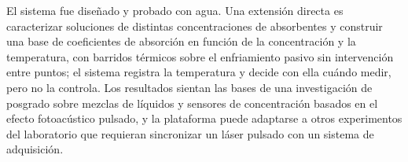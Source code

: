 El sistema fue diseñado y probado con agua. Una extensión directa es
caracterizar soluciones de distintas concentraciones de absorbentes y
construir una base de coeficientes de absorción en función de la
concentración y la temperatura, con barridos térmicos sobre el
enfriamiento pasivo sin intervención entre puntos; el sistema registra
la temperatura y decide con ella cuándo medir, pero no la controla. Los
resultados sientan las bases de una investigación de posgrado sobre
mezclas de líquidos y sensores de concentración basados en el efecto
fotoacústico pulsado, y la plataforma puede adaptarse a otros
experimentos del laboratorio que requieran sincronizar un láser pulsado
con un sistema de adquisición.
